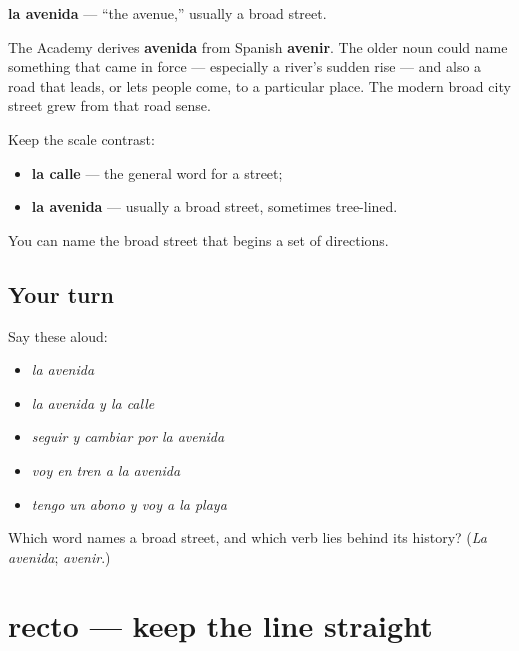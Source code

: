 \begin{cousinweb}
\textbf{la avenida} — \textquotedblleft{}the avenue,\textquotedblright{} usually a broad street.

The Academy derives \textbf{avenida} from Spanish \textbf{avenir}. The older noun could name something that came in force — especially a river's sudden rise — and also a road that leads, or lets people come, to a particular place. The modern broad city street grew from that road sense.

Keep the scale contrast:

\begin{itemize}
\raggedright
  \item \textbf{la calle} — the general word for a street;
  \item \textbf{la avenida} — usually a broad street, sometimes tree-lined.
\end{itemize}
\end{cousinweb}

\begin{grammarlens}[title={What you've built}]
You can name the broad street that begins a set of directions.
\end{grammarlens}

\subsection*{Your turn}
Say these aloud:

\begin{itemize}
\raggedright
  \item \emph{la avenida}
  \item \emph{la avenida y la calle}
  \item \emph{seguir y cambiar por la avenida}
  \item \emph{voy en tren a la avenida}
  \item \emph{tengo un abono y voy a la playa}
\end{itemize}

\begin{tcolorbox}[breakable,colback=teal!4,colframe=teal!35!black,title={Before you move on}]
Which word names a broad street, and which verb lies behind its history? (\emph{La avenida}; \emph{avenir}.)
\end{tcolorbox}
\section[recto]{recto — keep the line straight}

